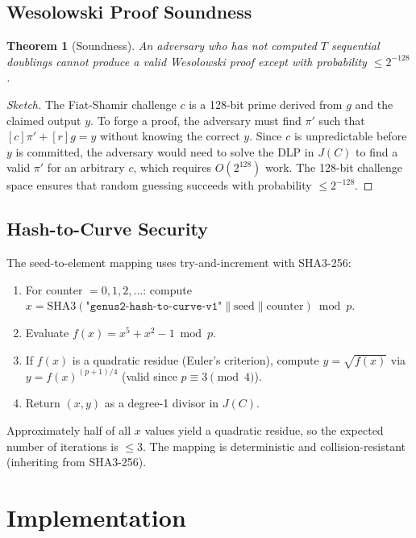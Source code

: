 \documentclass[11pt,a4paper]{article}
\newtheorem{theorem}{Theorem}[section]
\begin{document}
\subsection{Wesolowski Proof Soundness}

\begin{theorem}[Soundness]
An adversary who has not computed $T$ sequential doublings cannot produce a valid Wesolowski proof except with probability $\leq 2^{-128}$.
\end{theorem}

\begin{proof}[Sketch]
The Fiat-Shamir challenge $c$ is a 128-bit prime derived from $g$ and the claimed output $y$. To forge a proof, the adversary must find $\pi'$ such that $[c]\pi' + [r]g = y$ without knowing the correct $y$. Since $c$ is unpredictable before $y$ is committed, the adversary would need to solve the DLP in $J(C)$ to find a valid $\pi'$ for an arbitrary $c$, which requires $O(2^{128})$ work. The 128-bit challenge space ensures that random guessing succeeds with probability $\leq 2^{-128}$.
\end{proof}

\subsection{Hash-to-Curve Security}

The seed-to-element mapping uses try-and-increment with SHA3-256:

\begin{enumerate}
    \item For counter $= 0, 1, 2, \ldots$: compute $x = \mathrm{SHA3}(\texttt{"genus2-hash-to-curve-v1"} \| \mathrm{seed} \| \mathrm{counter}) \bmod p$.
    \item Evaluate $f(x) = x^5 + x^2 - 1 \bmod p$.
    \item If $f(x)$ is a quadratic residue (Euler's criterion), compute $y = \sqrt{f(x)}$ via $y = f(x)^{(p+1)/4}$ (valid since $p \equiv 3 \pmod{4}$).
    \item Return $(x, y)$ as a degree-1 divisor in $J(C)$.
\end{enumerate}

Approximately half of all $x$ values yield a quadratic residue, so the expected number of iterations is $\leq 3$. The mapping is deterministic and collision-resistant (inheriting from SHA3-256).

\section{Implementation}
\label{sec:implementation}
\end{document}
